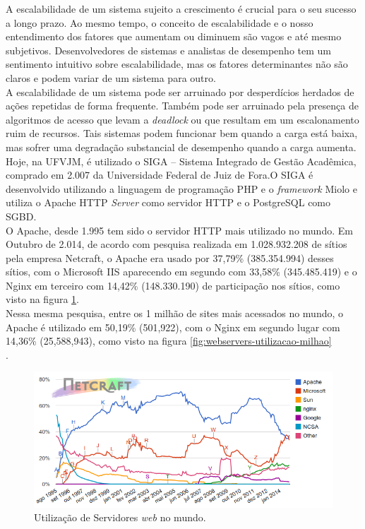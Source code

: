 A escalabilidade de um sistema sujeito a crescimento é crucial para o seu 
sucesso a longo prazo. Ao mesmo tempo, o conceito de escalabilidade e o nosso 
entendimento dos fatores que aumentam ou diminuem são vagos e até mesmo 
subjetivos. Desenvolvedores de sistemas e analistas de desempenho tem um 
sentimento intuitivo sobre escalabilidade, mas os fatores determinantes não são 
claros e podem variar de um sistema para outro.\\
A escalabilidade de um sistema pode ser arruinado por desperdícios herdados de 
ações repetidas de forma frequente. Também pode ser arruinado pela presença de 
algoritmos de acesso que levam a \textit{deadlock} ou que resultam em um 
escalonamento ruim de recursos. Tais sistemas podem funcionar bem quando a 
carga está baixa, mas sofrer uma degradação substancial de desempenho quando a 
carga aumenta.\\
Hoje, na UFVJM, é utilizado o SIGA – Sistema Integrado de Gestão Acadêmica, 
comprado em 2.007 da Universidade Federal de Juiz de Fora.O SIGA é desenvolvido 
utilizando a linguagem de programação PHP e o \textit{framework} Miolo e 
utiliza o Apache HTTP \textit{Server} como servidor HTTP e o PostgreSQL como 
SGBD.\\
O Apache, desde 1.995 tem sido o servidor HTTP mais utilizado no mundo. Em 
Outubro de 2.014, de acordo com pesquisa realizada em 1.028.932.208 de sítios 
pela empresa Netcraft, o Apache era usado por 37,79\% (385.354.994) desses 
sítios, com o Microsoft IIS aparecendo em segundo com 33,58\% (345.485.419) e o 
Nginx em terceiro com 14,42\% (148.330.190) de participação nos sítios, como 
visto na figura \ref{fig:webservers-utilizacao}.\\
Nessa mesma pesquisa, entre os 1 milhão de sites mais acessados no mundo, o 
Apache é utilizado em 50,19\% (501,922), com o Nginx em segundo lugar com 
14,36\% (25,588,943), como visto na figura 
\ref{fig:webservers-utilizacao-milhao}\\.
\begin{figure}[htb]
	\centering
	\includegraphics[width=1\linewidth]{figuras/grafico1}
	\caption{Utilização de Servidores \textit{web} no mundo.}
	\label{fig:webservers-utilizacao}
\end{figure}

